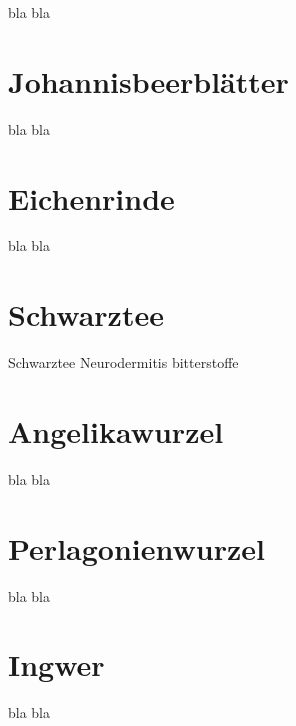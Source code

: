 bla bla



\section{Johannisbeerblätter}
\label{   }

bla bla



\section{Eichenrinde}
\label{   }

bla bla



\section{Schwarztee}
\label{   }


Schwarztee
Neurodermitis
bitterstoffe


\section{Angelikawurzel}
\label{   }

bla bla



\section{Perlagonienwurzel}
\label{   }

bla bla



\section{Ingwer}
\label{   }

bla bla



